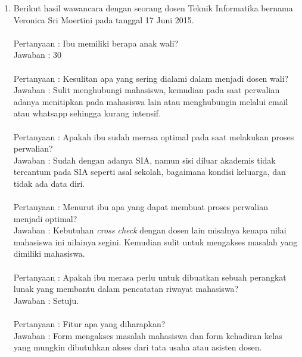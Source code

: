 \begin{enumerate}
\item Berikut hasil wawancara dengan seorang dosen Teknik Informatika bernama Veronica Sri Moertini pada tanggal 17 Juni 2015.\\\\
Pertanyaan : Ibu memiliki berapa anak wali?\\
Jawaban : 30 \\\\
Pertanyaan : Kesulitan apa yang sering dialami dalam menjadi dosen wali?\\
Jawaban : Sulit menghubungi mahasiswa, kemudian pada saat perwalian adanya menitipkan pada mahasiswa lain atau menghubungin melalui email atau whatsapp sehingga kurang intensif.\\\\
Pertanyaan : Apakah ibu sudah merasa optimal pada saat melakukan proses perwalian?\\
Jawaban : Sudah dengan adanya SIA, namun sisi diluar akademis tidak tercantum pada SIA seperti asal sekolah, bagaimana kondisi keluarga, dan tidak ada data diri.\\\\
Pertanyaan : Menurut ibu apa yang dapat membuat proses perwalian menjadi optimal?\\
Jawaban : Kebutuhan {\it cross check} dengan dosen lain misalnya kenapa nilai mahasiswa ini nilainya segini. Kemudian sulit untuk mengakses masalah yang dimiliki mahasiswa.\\\\
Pertanyaan : Apakah ibu merasa perlu untuk dibuatkan sebuah perangkat lunak yang membantu dalam pencatatan riwayat mahasiswa?\\
Jawaban : Setuju.\\\\
Pertanyaan : Fitur apa yang diharapkan?\\
Jawaban : Form mengakses masalah mahasiswa dan form kehadiran kelas yang mungkin dibutuhkan akses dari tata usaha atau asisten dosen.\\

\end{enumerate}